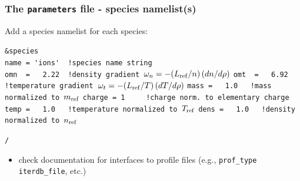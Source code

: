\documentclass[9pt]{beamer}
\begin{document}
\begin{frame}[fragile]
  \frametitle{The {\tt parameters} file - species namelist({\bf s})}

\begin{block}

Add a species namelist for each species:
\begin{block}

\verb|&species|\\
\verb|name = 'ions'  !species name string|\\
\verb|omn  =   2.22  !density gradient |$\omega_n=-(L_{\rm ref}/n)\,(dn/d\rho)$
\verb|omt  =   6.92  !temperature gradient |$\omega_t=-(L_{\rm ref}/T)\,(dT/d\rho)$
\verb|mass =   1.0   !mass normalized to |$m_{\rm ref}$
\verb|charge = 1     !charge norm. to elementary charge|
\verb|temp =   1.0   !temperature normalized to |$T_{\rm ref}$
\verb|dens =   1.0   !density normalized to |$n_{\rm ref}$

\verb|/|
\end{block}
\begin{itemize}
 \item check documentation for interfaces to profile files (e.g., {\tt prof\_type}
 {\tt iterdb\_file}, etc.)
\end{itemize}

\end{block}

\end{frame}

\end{document}
